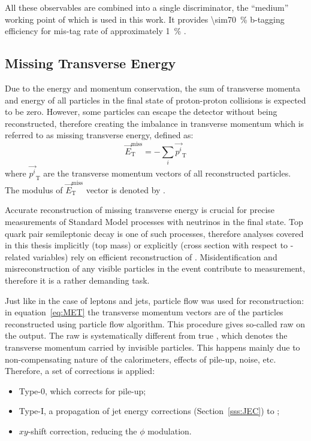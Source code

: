 All these observables are combined into a single discriminator, the ``medium'' working point of which is used in this
work. It provides \SI{\sim70}{\percent} b-tagging efficiency for mis-tag rate of approximately \SI{1}{\percent}
\autocite{b-tagging_CMS}.


\subsection{Missing Transverse Energy}
\label{ss:MET_reconstruction}
Due to the energy and momentum conservation, the sum of transverse momenta and energy of all particles in the final
state of proton-proton collisions is expected to be zero. However, some particles can escape the detector without being
reconstructed, therefore creating the imbalance in transverse momentum which is referred to as missing transverse
energy, defined as:
\begin{equation}
\label{eq:MET}
\vec{E}_\mathrm{T}^\mathrm{miss} = - \sum_i \vec{p^i}_\mathrm{T}
\end{equation}
where $\vec{p^i}_\mathrm{T}$ are the transverse momentum vectors of all reconstructed particles. The modulus of
$\vec{E}_\mathrm{T}^\mathrm{miss}$ vector is denoted by \MET.

Accurate reconstruction of missing transverse energy is crucial for precise measurements of Standard Model processes
with neutrinos in the final state. Top quark pair semileptonic decay is one of such processes, therefore analyses
covered in this thesis implicitly (top mass) or explicitly (\ttbar cross section with respect to \MET-related variables)
rely on efficient reconstruction of \MET. Misidentification and misreconstruction of any visible particles in the event
contribute to \MET measurement, therefore it is a rather demanding task.

Just like in the case of leptons and jets, particle flow was used for \MET reconstruction: in equation~\ref{eq:MET} the
transverse momentum vectors are of the particles reconstructed using particle flow algorithm. This procedure gives
so-called raw \MET on the output. The raw \MET is systematically different from true \MET, which denotes the transverse
momentum carried by invisible particles. This happens mainly due to non-compensating nature of the calorimeters,
effects of pile-up, noise, etc. Therefore, a set of corrections is applied:
\begin{itemize}
 \item Type-0, which corrects \MET for pile-up;
 \item Type-I, a propagation of jet energy corrections (Section~\ref{sss:JEC}) to \MET;
 \item $xy$-shift correction, reducing the \MET $\phi$ modulation.
\end{itemize}

